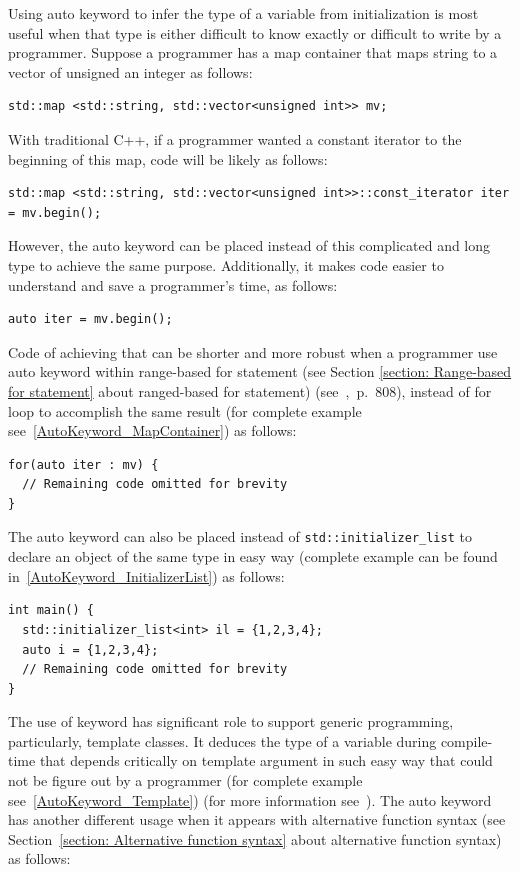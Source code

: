 \documentclass[11pt]{report}
\begin{document}
Using auto keyword to infer the type of a variable from initialization is most useful when that type is either difficult to know exactly or difficult to write by a programmer. Suppose a programmer has a map container that maps string to a vector of unsigned an integer as follows: 
\begin{lstlisting}
std::map <std::string, std::vector<unsigned int>> mv;
\end{lstlisting}
With traditional C++, if a programmer wanted a constant iterator to the beginning of this map, code will be likely as follows:
\begin{lstlisting}
std::map <std::string, std::vector<unsigned int>>::const_iterator iter = mv.begin();
\end{lstlisting}
However, the auto keyword can be placed instead of this complicated and long type to achieve the same purpose. Additionally, it makes code easier to understand and save a programmer's time, as follows:
\begin{lstlisting}
auto iter = mv.begin();
\end{lstlisting}
Code of achieving that can be shorter and more robust when a programmer use auto keyword within range-based for statement (see Section \ref{section: Range-based for statement} about ranged-based for statement) (see~\cite{Horstmann:2008:BC},~p.~808), instead of for loop to accomplish the same result (for complete example see~\ref{AutoKeyword_MapContainer}) as follows: 
\begin{lstlisting}
for(auto iter : mv) {
  // Remaining code omitted for brevity
}
\end{lstlisting}
The auto keyword can also be placed instead of \texttt{std::initializer\_list} to declare an object of the same type in easy way (complete example can be found in~\ref{AutoKeyword_InitializerList}) as follows:
\begin{lstlisting}
int main() {
  std::initializer_list<int> il = {1,2,3,4};
  auto i = {1,2,3,4};
  // Remaining code omitted for brevity
}
\end{lstlisting}
The use of keyword has significant role to support generic programming, particularly, template classes. It deduces the type of a variable  during compile-time that depends critically on template argument in such easy way that could not be figure out by a programmer (for complete example see~\ref{AutoKeyword_Template}) (for more information see~\cite{Stroustrup:2012:Cpp11}). The auto keyword has another different usage when it appears with alternative function syntax (see Section~\ref{section: Alternative function syntax} about alternative function syntax) as follows:
\end{document}
